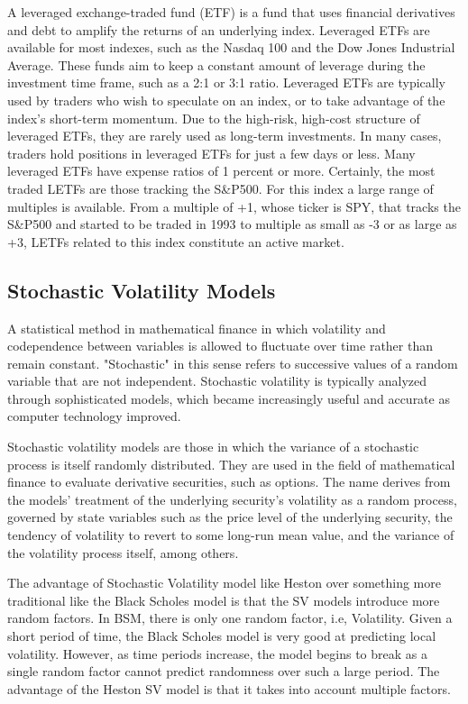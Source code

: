 \documentclass{article}
\begin{document}
A leveraged exchange-traded fund (ETF) is a fund that uses financial derivatives and debt to amplify the returns of an underlying index. Leveraged ETFs are available for most indexes, such as the Nasdaq 100 and the Dow Jones Industrial Average. These funds aim to keep a constant amount of leverage during the investment time frame, such as a 2:1 or 3:1 ratio. Leveraged ETFs are typically used by traders who wish to speculate on an index, or to take advantage of the index's short-term momentum. Due to the high-risk, high-cost structure of leveraged ETFs, they are rarely used as long-term investments. In many cases, traders hold positions in leveraged ETFs for just a few days or less. Many leveraged ETFs have expense ratios of 1 percent or more.\citep{ref5}
Certainly, the most traded LETFs are those tracking the S&P500. For this index a large range of multiples is available. From a multiple of +1, whose ticker is SPY, that tracks the S&P500 and started to be traded in 1993 to multiple as small as -3 or as large as +3, LETFs related to this index constitute an active market. \citep{ref3}


\subsection{Stochastic Volatility Models}
A statistical method in mathematical finance in which volatility and codependence between variables is allowed to fluctuate over time rather than remain constant. "Stochastic" in this sense refers to successive values of a random variable that are not independent. Stochastic volatility is typically analyzed through sophisticated models, which became increasingly useful and accurate as computer technology improved. \citep{ref8}
\newline

Stochastic volatility models are those in which the variance of a stochastic process is itself randomly distributed. They are used in the field of mathematical finance to evaluate derivative securities, such as options. The name derives from the models' treatment of the underlying security's volatility as a random process, governed by state variables such as the price level of the underlying security, the tendency of volatility to revert to some long-run mean value, and the variance of the volatility process itself, among others. \citep{ref7}
\newline

The advantage of Stochastic Volatility model like Heston over something more traditional like the Black Scholes model is that the SV models introduce more random factors. In BSM, there is only one random factor, i.e, Volatility.  Given a short period of time, the Black Scholes model is very good at predicting local volatility. However, as time periods increase, the model begins to break as a single random factor cannot predict randomness over such a large period. The advantage of the Heston SV model is that it takes into account multiple factors. 
\newline
\end{document}
